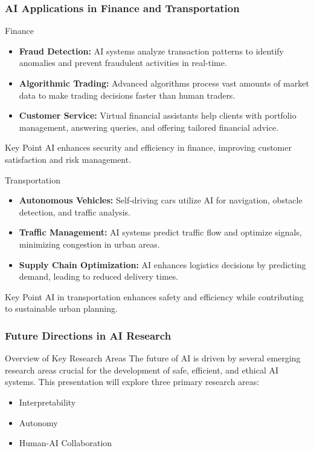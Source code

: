 \documentclass{beamer}
\begin{document}
\begin{frame}[fragile]
    \frametitle{AI Applications in Finance and Transportation}
    \begin{block}{Finance}
        \begin{itemize}
            \item \textbf{Fraud Detection:} AI systems analyze transaction patterns to identify anomalies and prevent fraudulent activities in real-time.
            \item \textbf{Algorithmic Trading:} Advanced algorithms process vast amounts of market data to make trading decisions faster than human traders.
            \item \textbf{Customer Service:} Virtual financial assistants help clients with portfolio management, answering queries, and offering tailored financial advice.
        \end{itemize}
        \begin{block}{Key Point}
            AI enhances security and efficiency in finance, improving customer satisfaction and risk management.
        \end{block}
    \end{block}
    \begin{block}{Transportation}
        \begin{itemize}
            \item \textbf{Autonomous Vehicles:} Self-driving cars utilize AI for navigation, obstacle detection, and traffic analysis.
            \item \textbf{Traffic Management:} AI systems predict traffic flow and optimize signals, minimizing congestion in urban areas.
            \item \textbf{Supply Chain Optimization:} AI enhances logistics decisions by predicting demand, leading to reduced delivery times.
        \end{itemize}
        \begin{block}{Key Point}
            AI in transportation enhances safety and efficiency while contributing to sustainable urban planning.
        \end{block}
    \end{block}
\end{frame}

\begin{frame}[fragile]
    \frametitle{Future Directions in AI Research}
    \begin{block}{Overview of Key Research Areas}
        The future of AI is driven by several emerging research areas crucial for the development of safe, efficient, and ethical AI systems. This presentation will explore three primary research areas:
        \begin{itemize}
            \item Interpretability
            \item Autonomy
            \item Human-AI Collaboration
        \end{itemize}
    \end{block}
\end{frame}
\end{document}
